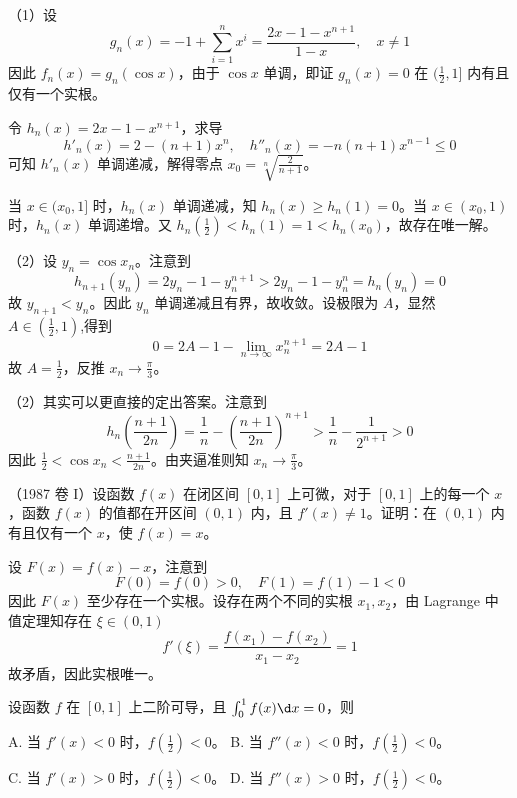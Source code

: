 \begin{solution}
	（1）设
	\[ g_n(x) =  - 1 + \sum_{i=1}^n x^i = \frac{2x - 1 - x^{n+1}}{1 - x}, \quad x \neq 1 \]
	因此 $f_n(x) = g_n(\cos x)$，由于 $\cos x$ 单调，即证 $g_n(x) = 0$ 在 $(\frac{1}{2}, 1]$ 内有且仅有一个实根。


	令 $h_n(x) = 2x - 1 - x^{n+1}$，求导
	\[ h'_n(x) = 2 - (n + 1)x^n, \quad h''_n(x) = - n(n+1) x^{n-1} \leqslant 0 \]
	可知 $h'_n(x)$ 单调递减，解得零点 $x_0 = \sqrt[n]{\frac{2}{n + 1}}$。

	当 $x \in (x_0, 1]$ 时，$h_n(x)$ 单调递减，知 $h_n(x) \geqslant h_n(1) = 0$。当 $x \in (x_0, 1)$ 时，$h_n(x)$ 单调递增。又 $h_n(\frac{1}{2}) <  h_n(1) = 1 < h_n(x_0)$，故存在唯一解。

	（2）设 $y_n = \cos x_n$。注意到
	\[ h_{n+1}(y_n) = 2 y_n - 1 - y_{n}^{n+1} > 2 y_n - 1 - y_{n}^n = h_n(y_n) = 0 \]
	故 $y_{n+1} < y_{n}$。因此 $y_n$ 单调递减且有界，故收敛。设极限为 $A$，显然 $A \in (\frac{1}{2}, 1)$,得到
	\[ 0 = 2A - 1 - \lim_{n \to \infty} x_n^{n+1} = 2A - 1 \]
	故 $A = \frac{1}{2}$，反推 $x_n \to \frac{\pi}{3}$。

	（2）其实可以更直接的定出答案。注意到
	\[ h_n\left(\frac{n + 1}{2n}\right) = \frac{1}{n} - \left(\frac{n + 1}{2n}\right)^{n+1} > \frac{1}{n} - \frac{1}{2^{n+1}} > 0 \]
	因此 $\frac{1}{2} < \cos x_n < \frac{n + 1}{2n}$。由夹逼准则知 $x_n \to \frac{\pi}{3}$。

\end{solution}

\begin{problem}[000021]
（1987 卷 I）设函数 $f(x)$ 在闭区间 $[0,1]$ 上可微，对于 $[0, 1]$ 上的每一个 $x$，函数 $f(x)$ 的值都在开区间 $(0, 1)$ 内，且 $f'(x) \neq 1$。证明：在 $(0, 1)$ 内有且仅有一个 $x$，使 $f(x) = x$。
\end{problem}

\begin{solution}
	设 $F(x) = f(x) - x$，注意到
	\[ F(0) = f(0) > 0, \quad F(1) = f(1) - 1 < 0 \]
	因此 $F(x)$ 至少存在一个实根。设存在两个不同的实根 $x_1, x_2$，由 Lagrange 中值定理知存在 $\xi \in (0, 1)$
	\[ f'(\xi) = \frac{f(x_1) - f(x_2)}{x_1 - x_2} = 1 \]
	故矛盾，因此实根唯一。
\end{solution}


\begin{problem}[000023]
设函数 $f$ 在 $[0, 1]$ 上二阶可导，且 $\int_{0}^{1} f(x) \d x = 0$，则

A. 当 $f'(x) < 0$ 时，$f(\frac{1}{2}) < 0$。
B. 当 $f''(x) < 0$ 时，$f(\frac{1}{2}) < 0$。

C. 当 $f'(x) > 0$ 时，$f(\frac{1}{2}) < 0$。
D. 当 $f''(x) > 0$ 时，$f(\frac{1}{2}) < 0$。
\end{problem}

